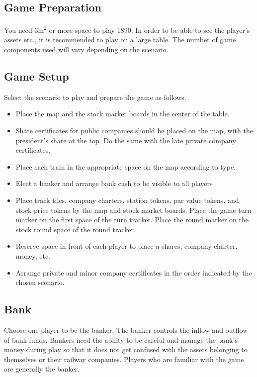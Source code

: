 \documentclass{article}
\begin{document}
\begin{CJK}{UTF8}{min}
\begin{multicols}{2}
\section{Game Preparation}
You need 3m\textsuperscript{2} or more space to play 1890. In order to
be able to see the player's assets etc., it is recommended to play on
a large table. The number of game components used will vary depending
on the scenario.


\subsection{Game Setup}
Select the scenario to play and prepare the game as follows.
\begin{itemize}
\item Place the map and the stock market boards in the center of the table.

\item Share certificates for public companies should be placed on the
  map, with the president's share at the top. Do the same with the
  late private company certificates.

\item Place each train in the appropriate space on the map according to type.

\item Elect a banker and arrange bank cash to be visible to all players

\item Place track tiles, company charters, station tokens, par
  value tokens, and stock price tokens by the map and stock market
  boards. Place the game turn marker on the first space of the turn
  tracker. Place the round marker on the stock round space of the
  round tracker.

\item Reserve space in front of each player to place a shares, company
  charter, money, etc.

\item Arrange private and minor company certificates in the order
  indicated by the chosen scenario.

\end{itemize}


\subsection{Bank}
Choose one player to be the banker. The banker controls the inflow and
outflow of bank funds. Bankers need the ability to be careful and
manage the bank's money during play so that it does not get confused
with the assets belonging to themselves or their railway companies.
Players who are familiar with the game are generally the banker. 


\end{multicols}
\end{CJK}
\end{document}
